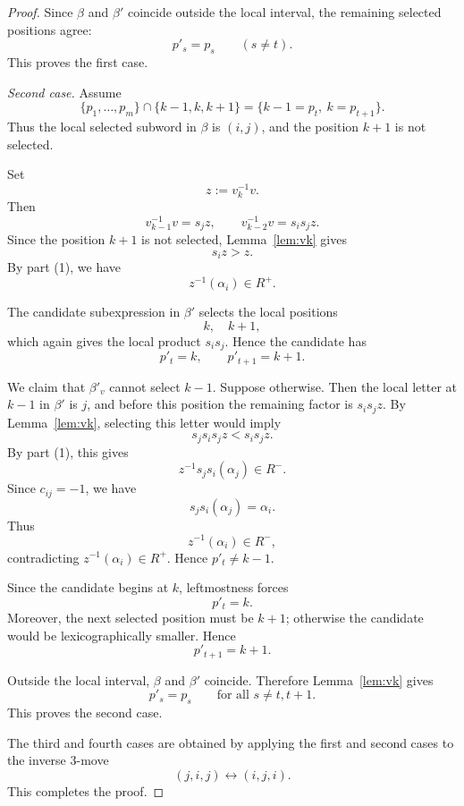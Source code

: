 \documentclass[10pt,a4paper]{amsart}
\begin{document}
\begin{proof}
Since \(\beta\) and \(\beta'\) coincide outside the local interval, the
remaining selected positions agree:
\[
p'_s=p_s\qquad(s\neq t).
\]
This proves the first case.

\medskip
\noindent
\emph{Second case.}
Assume
\[
\{p_1,\dots,p_m\}\cap\{k-1,k,k+1\}
=
\{k-1=p_t,\ k=p_{t+1}\}.
\]
Thus the local selected subword in \(\beta\) is \((i,j)\), and the position
\(k+1\) is not selected.

Set
\[
z:=v_k^{-1}v.
\]
Then
\[
v_{k-1}^{-1}v=s_jz,
\qquad
v_{k-2}^{-1}v=s_is_jz.
\]
Since the position \(k+1\) is not selected, Lemma~\ref{lem:vk} gives
\[
s_iz>z.
\]
By part (1), we have
\[
z^{-1}(\alpha_i)\in R^+.
\]

The candidate subexpression in \(\beta'\) selects the local positions
\[
k,\quad k+1,
\]
which again gives the local product \(s_is_j\). Hence the candidate has
\[
p'_t=k,\qquad p'_{t+1}=k+1.
\]

We claim that \(\beta'_v\) cannot select \(k-1\). Suppose otherwise. Then the
local letter at \(k-1\) in \(\beta'\) is \(j\), and before this position the
remaining factor is \(s_is_jz\). By Lemma~\ref{lem:vk}, selecting this letter
would imply
\[
s_js_is_jz<s_is_jz.
\]
By part (1), this gives
\[
z^{-1}s_js_i(\alpha_j)\in R^-.
\]
Since \(c_{ij}=-1\), we have
\[
s_js_i(\alpha_j)=\alpha_i.
\]
Thus
\[
z^{-1}(\alpha_i)\in R^-,
\]
contradicting \(z^{-1}(\alpha_i)\in R^+\). Hence \(p'_t\neq k-1\).

Since the candidate begins at \(k\), leftmostness forces
\[
p'_t=k.
\]
Moreover, the next selected position must be \(k+1\); otherwise the candidate
would be lexicographically smaller. Hence
\[
p'_{t+1}=k+1.
\]

Outside the local interval, \(\beta\) and \(\beta'\) coincide. Therefore
Lemma~\ref{lem:vk} gives
\[
p'_s=p_s
\qquad
\text{for all }s\neq t,t+1.
\]
This proves the second case.

The third and fourth cases are obtained by applying the first and second cases
to the inverse \(3\)-move
\[
(j,i,j)\longleftrightarrow(i,j,i).
\]
This completes the proof.
\end{proof}
\end{document}
